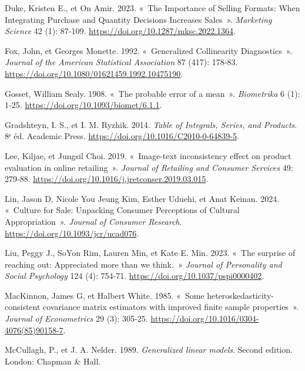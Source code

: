 \documentclass[
  11pt,
  letterpaper,
]{scrbook}
\newlength{\cslhangindent}
\newenvironment{CSLReferences}[2] %
 {\begin{list}{}{%
  \setlength{\itemindent}{0pt}
  \setlength{\leftmargin}{0pt}
  \setlength{\parsep}{0pt}
  \ifodd #1
   \setlength{\leftmargin}{\cslhangindent}
   \setlength{\itemindent}{-1\cslhangindent}
  \fi
  \setlength{\itemsep}{#2\baselineskip}}}
 {\end{list}}
\theoremstyle{plain}
\theoremstyle{plain}
\theoremstyle{definition}
\theoremstyle{definition}
\theoremstyle{remark}
\begin{document}
\begin{CSLReferences}{1}{0}
Duke, Kristen E., et On Amir. 2023. {«~The Importance of Selling
Formats: When Integrating Purchase and Quantity Decisions Increases
Sales~»}. \emph{Marketing Science} 42 (1): 87‑109.
\url{https://doi.org/10.1287/mksc.2022.1364}.

Fox, John, et Georges Monette. 1992. {«~Generalized Collinearity
Diagnostics~»}. \emph{Journal of the American Statistical Association}
87 (417): 178‑83. \url{https://doi.org/10.1080/01621459.1992.10475190}.

Gosset, William Sealy. 1908. {«~The probable error of a mean~»}.
\emph{Biometrika} 6 (1): 1‑25.
\url{https://doi.org/10.1093/biomet/6.1.1}.

Gradshteyn, I. S., et I. M. Ryzhik. 2014. \emph{Table of Integrals,
Series, and Products}. 8ᵉ éd. Academic Press.
\url{https://doi.org/10.1016/C2010-0-64839-5}.

Lee, Kiljae, et Jungsil Choi. 2019. {«~Image-text inconsistency effect
on product evaluation in online retailing~»}. \emph{Journal of Retailing
and Consumer Services} 49: 279‑88.
\url{https://doi.org/10.1016/j.jretconser.2019.03.015}.

Lin, Jason D, Nicole You Jeung Kim, Esther Uduehi, et Anat Keinan. 2024.
{«~Culture for Sale: Unpacking Consumer Perceptions of Cultural
Appropriation~»}. \emph{Journal of Consumer Research}.
\url{https://doi.org/10.1093/jcr/ucad076}.

Liu, Peggy J., SoYon Rim, Lauren Min, et Kate E. Min. 2023. {«~The
surprise of reaching out: Appreciated more than we think.~»}
\emph{Journal of Personality and Social Psychology} 124 (4): 754‑71.
\url{https://doi.org/10.1037/pspi0000402}.

MacKinnon, James G, et Halbert White. 1985. {«~Some
heteroskedasticity-consistent covariance matrix estimators with improved
finite sample properties~»}. \emph{Journal of Econometrics} 29 (3):
305‑25. \url{https://doi.org/10.1016/0304-4076(85)90158-7}.

McCullagh, P., et J. A. Nelder. 1989. \emph{Generalized linear models}.
{S}econd edition. London: Chapman \& Hall.


\end{CSLReferences}
\end{document}

